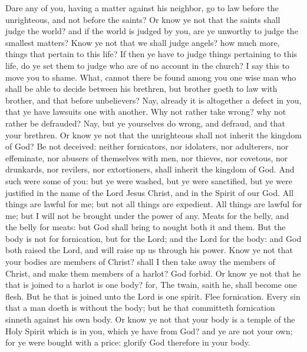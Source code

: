 Dare any of you, having a matter against his neighbor, go to law before the unrighteous, and not before the saints? Or know ye not that the saints shall judge the world? and if the world is judged by you, are ye unworthy to judge the smallest matters? Know ye not that we shall judge angels? how much more, things that pertain to this life? If then ye have to judge things pertaining to this life, do ye set them to judge who are of no account in the church? I say this to move you to shame. What, cannot there be found among you one wise man who shall be able to decide between his brethren, but brother goeth to law with brother, and that before unbelievers? Nay, already it is altogether a defect in you, that ye have lawsuits one with another. Why not rather take wrong? why not rather be defrauded? Nay, but ye yourselves do wrong, and defraud, and that your brethren. Or know ye not that the unrighteous shall not inherit the kingdom of God? Be not deceived: neither fornicators, nor idolaters, nor adulterers, nor effeminate, nor abusers of themselves with men, nor thieves, nor covetous, nor drunkards, nor revilers, nor extortioners, shall inherit the kingdom of God. And such were some of you: but ye were washed, but ye were sanctified, but ye were justified in the name of the Lord Jesus Christ, and in the Spirit of our God.  All things are lawful for me; but not all things are expedient. All things are lawful for me; but I will not be brought under the power of any. Meats for the belly, and the belly for meats: but God shall bring to nought both it and them. But the body is not for fornication, but for the Lord; and the Lord for the body: and God both raised the Lord, and will raise up us through his power. Know ye not that your bodies are members of Christ? shall I then take away the members of Christ, and make them members of a harlot? God forbid. Or know ye not that he that is joined to a harlot is one body? for, The twain, saith he, shall become one flesh. But he that is joined unto the Lord is one spirit. Flee fornication. Every sin that a man doeth is without the body; but he that committeth fornication sinneth against his own body. Or know ye not that your body is a temple of the Holy Spirit which is in you, which ye have from God? and ye are not your own; for ye were bought with a price: glorify God therefore in your body. 

